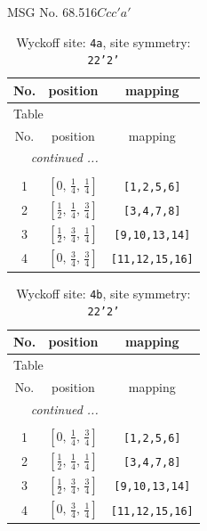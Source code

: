 \documentclass[fleqn,8pt]{jsarticle}
\begin{document}
\setcounter{MaxMatrixCols}{32}

\renewcommand{\tablename}{Table~}
\renewcommand{\figurename}{Figure~}
\begin{center}
\LARGE
MSG No. 68.516\quad$Ccc'a'$
\end{center}
\renewcommand{\arraystretch}{1.2}
\begin{longtable}{ccc}
\caption{Wyckoff site: {\tt 4a}, site symmetry: {\tt 22'2'}}
 \\
 \hline \hline
No. & position & mapping \\ \hline \endfirsthead

\multicolumn{2}{l}{\tablename\ \thetable{}} \\
 \hline \hline
No. & position & mapping \\ \hline \endhead

 \hline \hline
\multicolumn{2}{r}{\footnotesize\it continued ...} \\ \endfoot

 \hline \hline
\multicolumn{2}{r}{} \\ \endlastfoot

1 & $\left[ 0,\, \frac{1}{4},\, \frac{1}{4} \right]$ & {\tt [1,2,5,6]} \\ \hline
2 & $\left[ \frac{1}{2},\, \frac{1}{4},\, \frac{3}{4} \right]$ & {\tt [3,4,7,8]} \\ \hline
3 & $\left[ \frac{1}{2},\, \frac{3}{4},\, \frac{1}{4} \right]$ & {\tt [9,10,13,14]} \\ \hline
4 & $\left[ 0,\, \frac{3}{4},\, \frac{3}{4} \right]$ & {\tt [11,12,15,16]} \\
\end{longtable}
\renewcommand{\arraystretch}{1.2}
\begin{longtable}{ccc}
\caption{Wyckoff site: {\tt 4b}, site symmetry: {\tt 22'2'}}
 \\
 \hline \hline
No. & position & mapping \\ \hline \endfirsthead

\multicolumn{2}{l}{\tablename\ \thetable{}} \\
 \hline \hline
No. & position & mapping \\ \hline \endhead

 \hline \hline
\multicolumn{2}{r}{\footnotesize\it continued ...} \\ \endfoot

 \hline \hline
\multicolumn{2}{r}{} \\ \endlastfoot

1 & $\left[ 0,\, \frac{1}{4},\, \frac{3}{4} \right]$ & {\tt [1,2,5,6]} \\ \hline
2 & $\left[ \frac{1}{2},\, \frac{1}{4},\, \frac{1}{4} \right]$ & {\tt [3,4,7,8]} \\ \hline
3 & $\left[ \frac{1}{2},\, \frac{3}{4},\, \frac{3}{4} \right]$ & {\tt [9,10,13,14]} \\ \hline
4 & $\left[ 0,\, \frac{3}{4},\, \frac{1}{4} \right]$ & {\tt [11,12,15,16]} \\
\end{longtable}
\end{document}
